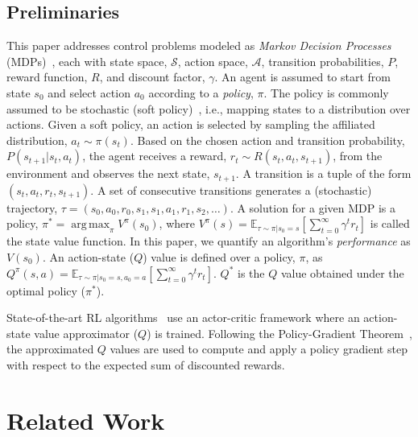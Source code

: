 \documentclass[letterpaper]{article} %
\DeclareMathOperator*{\argmax}{arg\,max}
\begin{document}
        \subsection{Preliminaries} 
            This paper addresses control problems modeled as \textit{Markov Decision Processes} (MDPs)~\cite{puterman2014markov}, each with state space, $\mathcal{S}$, action space, $\mathcal{A}$, transition probabilities, $P$, reward function, $R$, and discount factor, $\gamma$. 
            An agent is assumed to start from state $s_0$ and select action $a_0$ according to a \textit{policy}, $\pi$. The policy is commonly assumed to be stochastic (soft policy)~\cite{haarnoja2018soft}, i.e., mapping states to a distribution over actions.
            Given a soft policy, an action is selected by sampling the affiliated distribution, $a_t \sim \pi(s_t)$. Based on the chosen action and transition probability, $P(s_{t+1} | s_t, a_t)$, the agent receives a reward, $r_t \sim R(s_t, a_t, s_{t+1})$, from the environment and observes the next state, $s_{t+1}$. A transition is a tuple of the form $(s_t,a_t,r_t,s_{t+1})$. A set of consecutive transitions generates a (stochastic) trajectory, $\tau = (s_0, a_0, r_0, s_1, s_1, a_1, r_1, s_2,\ldots)$. A solution for a given MDP is a policy, $\pi^* = \argmax_{\pi} V^{\pi}(s_0)$, where $V^{\pi}(s)=\mathbb{E}_{\tau \sim \pi| s_0=s}[\sum_{t=0}^{\infty}\gamma^t r_t]$ is called the state value function. In this paper, we quantify an algorithm's \textit{performance} as $V(s_0)$. An action-state ($Q$) value is defined over a policy, $\pi$, as $Q^\pi(s,a)=\mathbb{E}_{\tau \sim \pi | s_0=s, a_0=a}[\sum_{t=0}^{\infty}\gamma^t r_t]$. $Q^*$ is the $Q$ value obtained under the optimal policy ($\pi^*$). %

            State-of-the-art RL algorithms~\cite{haarnoja2018soft} use an actor-critic framework where an action-state value approximator ($Q$) is trained. Following the Policy-Gradient Theorem~\cite{reinforce}, the approximated $Q$ values are used to compute and apply a policy gradient step with respect to the expected sum of discounted rewards.

    \section{Related Work}
\end{document}
